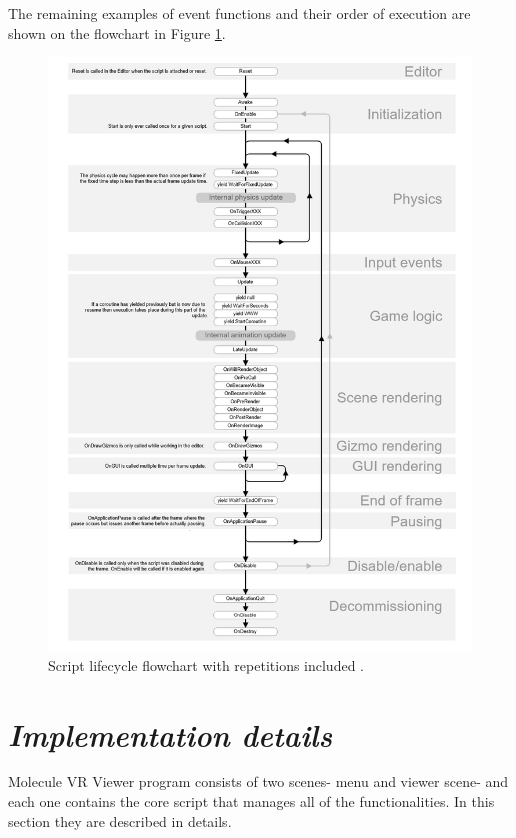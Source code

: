 The remaining examples of event functions and their order of execution are shown on the flowchart in Figure \ref{fig:monobehaviour}.

\begin{figure}[p]
\centering    
\includegraphics[width=1.0\textwidth]{Figs/monobehaviour_flowchart.png}
\caption{Script lifecycle flowchart with repetitions included \cite{Unity16}.}
\label{fig:monobehaviour} 
\end{figure} 

\section{\textit{Implementation details}} %

Molecule VR Viewer program consists of two scenes- menu and viewer scene- and each one contains the core script that manages all of the functionalities. In this section they are described in details.

